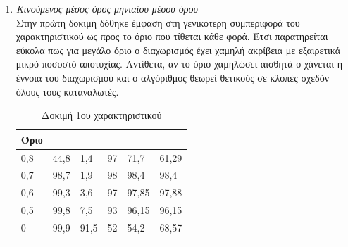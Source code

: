 \begin{enumerate}
\item{\textit{Κινούμενος μέσος όρος μηνιαίου μέσου όρου}} \\
Στην πρώτη δοκιμή δόθηκε έμφαση στη γενικότερη συμπεριφορά του χαρακτηριστικού ως προς το όριο που τίθεται κάθε φορά. Έτσι παρατηρείται εύκολα πως για μεγάλο όριο ο διαχωρισμός έχει χαμηλή ακρίβεια με εξαιρετικά μικρό ποσοστό αποτυχίας. Αντίθετα, αν το όριο χαμηλώσει αισθητά ο χάνεται η έννοια του διαχωρισμού και ο αλγόριθμος θεωρεί θετικούς σε κλοπές σχεδόν όλους τους καταναλωτές.
\begin{center}
\begin{longtabu}  to 0.8\textwidth { | X[c] || X[c] | X[c] | X[c] | X[c] | X[c] |  }
 \hline
  Όριο &   &  &  &  & \\
 ,8&	44,8&	1,4	&97	&71,7&	61,29\\
0,7&	98,7&	1,9	&98	&98,4&	98,4\\
0,6&	99,3&	3,6&	97&	97,85&	97,88\\
0,5&	99,8&	7,5	&93	&96,15&	96,15\\
0&	99,9&	91,5	&52	&54,2&	68,57\\
\hline
\caption{Δοκιμή 1ου χαρακτηριστικού}
\label{testfeat1}
\end{longtabu}
\end{center}


\end{enumerate}
